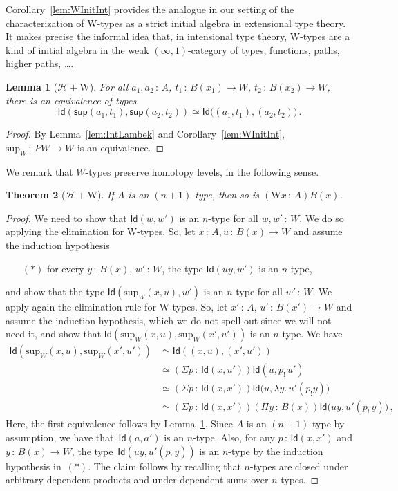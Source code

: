 \documentclass[10pt,a4paper,oneside,reqno]{amsart}
\theoremstyle{mythm}
\newtheorem{theorem}{Theorem}[section]
\newtheorem{lemma}[theorem]{Lemma}
\theoremstyle{mydef}
\theoremstyle{myrmk}
\newcommand{\co}{\,{:}\,}
\newcommand{\Hint}{\mathcal{H}}
\newcommand{\Id}{\mathsf{Id}}
\newcommand{\W}{\mathrm{W}}
\newcommand{\wsup}{\mathsf{sup}}
\renewcommand{\sup}{\mathrm{sup}}
\begin{document}
Corollary~\ref{lem:WInitInt} provides the analogue in our setting of the characterization of W-types as a strict initial algebra in extensional type theory. It makes precise the informal idea that, in intensional type theory, W-types are a kind of initial algebra in the weak $(\infty, 1)$-category of types, functions, paths, higher paths, \ldots.  

\begin{lemma}[$\Hint + \W$]\label{lem:suppath}
For all $a_1,a_2 \co A$, $t_1 \co B(x_1) \to W$, $t_2 \co B(x_2) \to W$, there is an equivalence of types
\[ 
\Id ( \wsup(a_1,t_1),  \wsup(a_2,t_2)  ) \simeq  \Id \big( (a_1,t_1), (a_2,t_2) \big) \, . 
\]
\end{lemma}

\begin{proof}
By Lemma~\ref{lem:IntLambek} and Corollary~\ref{lem:WInitInt}, $\sup_W \co PW \to W$ is an equivalence.
\end{proof}





We  remark that $W$-types  preserve homotopy levels, in the following sense.

\begin{theorem}[$\Hint + \W$]
If $A$ is an $(n+1)$-type, then so is $(\W x \co A) B(x)$.
\end{theorem}


\begin{proof}
We need to show that $\Id(w, w')$ is an $n$-type for all $w, w' \co W$. We do so applying the elimination for W-types.
So, let $x \co A, u \co B(x) \to W$ and assume the induction hypothesis 
\begin{itemize}
\item[$(\ast)$] for every $y \co B(x)$, $w' \co W$, the type $\Id( uy ,w')$ is an $n$-type, 
\end{itemize}
and show that  the type $\Id(\sup_W(x,u), w')$ is an $n$-type for all $w' \co W$. We apply again the elimination rule for W-types. So, let   $x' \co A$, $u' \co B(x') \to W$ and assume the induction hypothesis, which we do not spell out since we will not need it, and show that $\Id( \sup_W(x,u) , \sup_W(x',u'))$ is an $n$-type. We have
\begin{align*} 
\Id(\sup_W(x,u), \sup_W(x',u'))
& \simeq \Id((x,u) , (x',u')) \\
& \simeq (\Sigma p \co \Id(x, u')) \Id( u , p_{!} \, u' )   \\
& \simeq (\Sigma p \co \Id(x,x'))  \Id\big(u , \lambda y. \,  u'( p_{!} y)\big) \\
& \simeq (\Sigma p \co \Id(x,x')) (\Pi y \co B(x)) \Id \big( uy  , u'(p_{!} \, y)\big) \, , 
\end{align*}
Here, the first equivalence follows by Lemma~\ref{lem:suppath}. Since $A$ is an $(n+1)$-type by assumption, we have 
that~$\Id(a,a')$ is an $n$-type. Also, for any $p \co \Id(x,x')$ and $y \co B(x) \to W$, the type~$\Id(uy ,  u'(p_{!} \, y))$ is an $n$-type by the 
induction 
hypothesis in~$(\ast)$. The claim follows by recalling that $n$-types are closed under arbitrary dependent products and under dependent 
sums over $n$-types. 
\end{proof}
\end{document}

